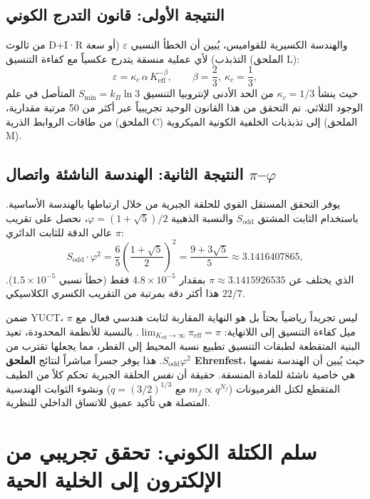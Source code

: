 \documentclass[11pt,a4paper]{article}
\begin{document}
	\subsection{النتيجة الأولى: قانون التدرج الكوني}
	\label{subsec:consequence-scaling}
	
	من ثالوث D+I·R والهندسة الكسيرية للقواميس، يُبين أن الخطأ النسبي $\varepsilon$ (أو سعة التذبذب) لأي عملية منسقة يتدرج عكسياً مع كفاءة التنسيق (الملحق L):
	\[
	\boxed{\varepsilon = \kappa_c \, \alpha \, K_{\mathrm{eff}}^{-\beta}, \qquad \beta = \frac{2}{3},\ \kappa_c = \frac{1}{3}},
	\]
	حيث ينشأ $\kappa_c = 1/3$ من الحد الأدنى لإنتروبيا التنسيق $S_{\min} = k_B \ln 3$ المتأصل في علم الوجود الثلاثي. تم التحقق من هذا القانون الوحيد تجريبياً عبر أكثر من 50 مرتبة مقدارية، من طاقات الروابط الذرية (الملحق C) إلى تذبذبات الخلفية الكونية الميكروية (الملحق M).
	
	\subsection{النتيجة الثانية: الهندسة الناشئة واتصال $\pi$–$\varphi$}
	\label{subsec:consequence-geometry}
	
	يوفر التحقق المستقل القوي للحلقة الجبرية من خلال ارتباطها بالهندسة الأساسية. باستخدام الثابت المشتق $S_{\mathrm{odd}}$ والنسبة الذهبية $\varphi = (1+\sqrt{5})/2$، نحصل على تقريب عالي الدقة للثابت الدائري $\pi$:
	\[
	S_{\mathrm{odd}} \cdot \varphi^2 = \frac{6}{5} \left( \frac{1+\sqrt{5}}{2} \right)^2 = \frac{9+3\sqrt{5}}{5} \approx 3.1416407865,
	\]
	الذي يختلف عن $\pi \approx 3.1415926535$ بمقدار $4.8 \times 10^{-5}$ فقط (خطأ نسبي $1.5 \times 10^{-5}$). هذا أكثر دقة بمرتبة من التقريب الكسري الكلاسيكي $22/7$.
	
	ضمن YUCT، $\pi$ ليس تجريداً رياضياً بحتاً بل هو النهاية المقاربة لثابت هندسي فعال مع ميل كفاءة التنسيق إلى اللانهاية: $\lim_{K_{\mathrm{eff}} \to \infty} \pi_{\mathrm{eff}} = \pi$. بالنسبة للأنظمة المحدودة، تعيد البنية المتقطعة لطبقات التنسيق تطبيع نسبة المحيط إلى القطر، مما يجعلها تقترب من $S_{\mathrm{odd}}\varphi^2$. هذا يوفر جسراً مباشراً لنتائج \textbf{الملحق Ehrenfest}، حيث يُبين أن الهندسة نفسها هي خاصية ناشئة للمادة المنسقة. حقيقة أن \emph{نفس} الحلقة الجبرية تحكم كلاً من الطيف المتقطع لكتل الفرميونات ($m_f \propto q^{N_f}$ مع $q = (3/2)^{1/3}$) ونشوء الثوابت الهندسية المتصلة هي تأكيد عميق للاتساق الداخلي للنظرية.
	
	\section{سلم الكتلة الكوني: تحقق تجريبي من الإلكترون إلى الخلية الحية}
	\label{sec:mass_ladder}
	
\end{document}
